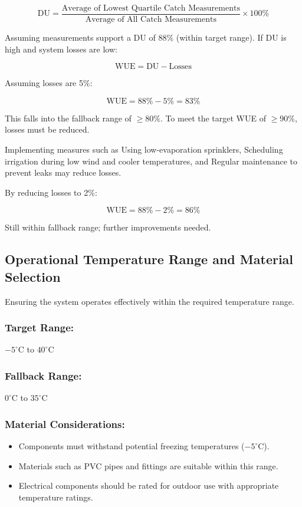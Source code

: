 \documentclass[12pt]{report}
\begin{document}
\[
\text{DU} = \frac{\text{Average of Lowest Quartile Catch Measurements}}{\text{Average of All Catch Measurements}} \times 100\%
\]

Assuming measurements support a DU of 88\% (within target range). If DU is high and system losses are low:

\[
\text{WUE} = \text{DU} - \text{Losses}
\]

Assuming losses are 5\%:

\[
\text{WUE} = 88\% - 5\% = 83\%
\]

This falls into the fallback range of \(\geq80\%\). To meet the target WUE of \(\geq90\%\), losses must be reduced.

Implementing measures such as Using low-evaporation sprinklers, Scheduling irrigation during low wind and cooler temperatures, and Regular maintenance to prevent leaks may reduce losses.

By reducing losses to 2\%:

\[
\text{WUE} = 88\% - 2\% = 86\%
\]

Still within fallback range; further improvements needed.

\subsection{Operational Temperature Range and Material Selection}

Ensuring the system operates effectively within the required temperature range.

\subsubsection{Target Range:} \(-5^\circ\text{C}\) to \(40^\circ\text{C}\)

\subsubsection{Fallback Range:} \(0^\circ\text{C}\) to \(35^\circ\text{C}\)

\subsubsection{Material Considerations:}

\begin{itemize}
    \item Components must withstand potential freezing temperatures (\(-5^\circ\text{C}\)).
\item Materials such as PVC pipes and fittings are suitable within this range.
\item Electrical components should be rated for outdoor use with appropriate temperature ratings.
\end{itemize}
\end{document}
